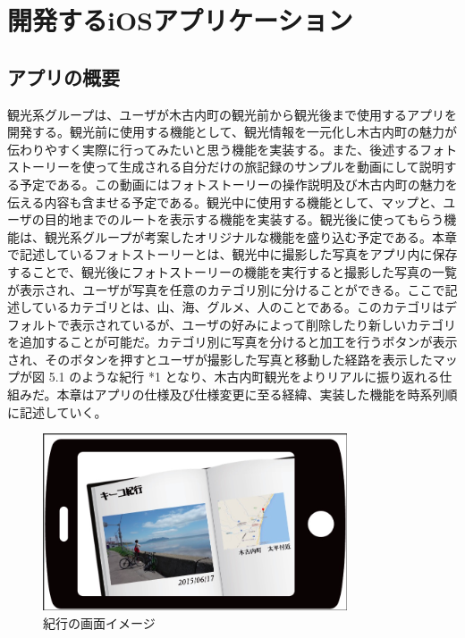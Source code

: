 \documentclass[openany,11pt,papersize]{jsbook}
\begin{document}


\chapter{開発するiOSアプリケーション}

\section{アプリの概要}
観光系グループは、ユーザが木古内町の観光前から観光後まで使用するアプリを開発する。観光前に使用する機能として、観光情報を一元化し木古内町の魅力が伝わりやすく実際に行ってみたいと思う機能を実装する。また、後述するフォトストーリーを使って生成される自分だけの旅記録のサンプルを動画にして説明する予定である。この動画にはフォトストーリーの操作説明及び木古内町の魅力を伝える内容も含ませる予定である。観光中に使用する機能として、マップと、ユーザの目的地までのルートを表示する機能を実装する。観光後に使ってもらう機能は、観光系グループが考案したオリジナルな機能を盛り込む予定である。本章で記述しているフォトストーリーとは、観光中に撮影した写真をアプリ内に保存することで、観光後にフォトストーリーの機能を実行すると撮影した写真の一覧が表示され、ユーザが写真を任意のカテゴリ別に分けることができる。ここで記述しているカテゴリとは、山、海、グルメ、人のことである。このカテゴリはデフォルトで表示されているが、ユーザの好みによって削除したり新しいカテゴリを追加することが可能だ。カテゴリ別に写真を分けると加工を行うボタンが表示され、そのボタンを押すとユーザが撮影した写真と移動した経路を表示したマップが図 5.1 のような紀行 *1 となり、木古内町観光をよりリアルに振り返れる仕組みだ。本章はアプリの仕様及び仕様変更に至る経緯、実装した機能を時系列順に記述していく。



\begin{figure}[htbp]
 \begin{center}
\includegraphics[width=9cm, bb=0 0 857 498]{5.1_kikou.png}
 \end{center}
 \caption{紀行の画面イメージ}
 \label{fig:one}
\end{figure}
\end{document}
